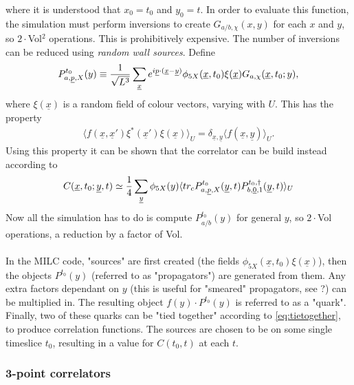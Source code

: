 where it is understood that $x_0=t_0$ and $y_0=t$. In order to evaluate this function, the simulation must perform inversions to create $G_{a/b,\chi}(x,y)$ for each $x$ and $y$, so $2\cdot$Vol$^2$ operations. This is prohibitively expensive. The number of inversions can be reduced using {\it{random wall sources}}. Define
\begin{align}
	P^{t_0}_{a,\underline{p},X}(y) \equiv {1\over \sqrt{L^3}} \sum_{\underline{x}} e^{i\underline{p}\cdot (\underline{x}-\underline{y})} \phi_{5X}(\underline{x},t_0) \xi(\underline{x}) G_{a,\chi}(\underline{x},t_0;y),
\end{align} 
where $\xi(\underline{x})$ is a random field of colour vectors, varying with $U$. This has the property
\begin{align}
	\langle f(\underline{x},\underline{x}') \xi^*(\underline{x}')\xi(\underline{x})\rangle_U = \delta_{\underline{x},\underline{y}} \langle f(\underline{x},\underline{y}) \rangle_U.
\end{align}
Using this property it can be shown that the correlator can be build instead according to
\begin{align}
	C(\underline{x},t_0;\underline{y},t) \simeq {1\over 4} \sum_{\underline{y}} \phi_{5X}(y) \langle tr_c P^{t_0}_{a,\underline{p},X}(\underline{y},t)P^{t_0,\dagger}_{b,\underline{0},1}(\underline{y},t)\rangle_U
	\label{eq:tietogether}
\end{align}
Now all the simulation has to do is compute $P^{t_0}_{a/b}(y)$ for general $y$, so $2\cdot$Vol operations, a reduction by a factor of Vol. 
\\ \\
In the MILC code, "sources" are first created (the fields $\phi_{5X}(\underline{x},t_0) \xi(\underline{x})$), then the objects $P^{t_0}(y)$ (referred to as "propagators") are generated from them. Any extra factors dependant on $y$ (this is useful for "smeared" propagators, see {\color{red}?}) can be multiplied in. The resulting object $f(y)\cdot P^{t_0}(y)$ is referred to as a "quark". Finally, two of these quarks can be "tied together" according to \eqref{eq:tietogether}, to produce correlation functions. The sources are chosen to be on some single timeslice $t_0$, resulting in a value for $C(t_0,t)$ at each $t$. 

\subsubsection{3-point correlators}

